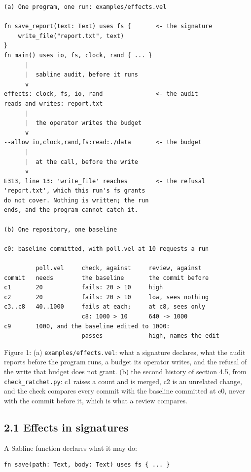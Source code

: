 \documentclass[
]{article}
\begin{document}
\begin{verbatim}
(a) One program, one run: examples/effects.vel

fn save_report(text: Text) uses fs {       <- the signature
    write_file("report.txt", text)
}
fn main() uses io, fs, clock, rand { ... }
      |
      |  sabline audit, before it runs
      v
effects: clock, fs, io, rand               <- the audit
reads and writes: report.txt
      |
      |  the operator writes the budget
      v
--allow io,clock,rand,fs:read:./data       <- the budget
      |
      |  at the call, before the write
      v
E313, line 13: 'write_file' reaches        <- the refusal
'report.txt', which this run's fs grants
do not cover. Nothing is written; the run
ends, and the program cannot catch it.

(b) One repository, one baseline

c0: baseline committed, with poll.vel at 10 requests a run

         poll.vel     check, against     review, against
commit   needs        the baseline       the commit before
c1       20           fails: 20 > 10     high
c2       20           fails: 20 > 10     low, sees nothing
c3..c8   40..1000     fails at each;     at c8, sees only
                      c8: 1000 > 10      640 -> 1000
c9       1000, and the baseline edited to 1000:
                      passes             high, names the edit
\end{verbatim}

Figure 1: (a) \texttt{examples/effects.vel}: what a signature declares,
what the audit reports before the program runs, a budget its operator
writes, and the refusal of the write that budget does not grant. (b) the
second history of section 4.5, from \texttt{check\_ratchet.py}: c1
raises a count and is merged, c2 is an unrelated change, and the check
compares every commit with the baseline committed at c0, never with the
commit before it, which is what a review compares.

\subsection{2.1 Effects in signatures}\label{effects-in-signatures}

A Sabline function declares what it may do:

\begin{verbatim}
fn save(path: Text, body: Text) uses fs { ... }
\end{verbatim}
\end{document}
